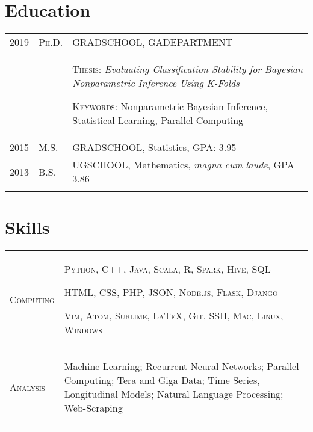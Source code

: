 \documentclass[a4paper,10pt]{article}
\begin{document}
\section{Education}
\begin{supertabular}{p{2cm} p{1.0cm} p{13.9cm}}
	\textsc{2019}		&		\textsc{Ph.D.} & \textsc{GRADSCHOOL}, \small GADEPARTMENT \\
					&&		 \begin{enumerate*}[label =$\diamond$, itemjoin={\newline}] 
							 \item \footnotesize \textsc{Thesis:} \emph{Evaluating Classification Stability for Bayesian Nonparametric Inference Using K-Folds} 
							 \item \footnotesize  \textsc{Keywords:} Nonparametric Bayesian Inference, Statistical Learning, Parallel Computing
							 \end{enumerate*}  \\
	\textsc{2015} 	& 	\textsc{M.S.} & \textsc{GRADSCHOOL}, \small Statistics, GPA: 3.95  \\
	\textsc{2013} 	& 	\textsc{B.S.} & \textsc{UGSCHOOL}, \small Mathematics, \emph{magna cum laude}, GPA 3.86 \\
	 \\
\end{supertabular}


\section{Skills}
\begin{supertabular}{p{3.4cm} p{13.9cm}}

	\textsc{Computing}			& \begin{enumerate*}[label =$\diamond$, itemjoin={\newline}]
																\item \small \textsc{Python, C++, Java, Scala, R, Spark, Hive, SQL}
																\item \small \textsc{HTML, CSS, PHP, JSON, Node.js, Flask, Django}
																\item \small \textsc{Vim, Atom, Sublime, {\fb \LaTeX}, Git, SSH, Mac, Linux, Windows }
																\end{enumerate*} \vspace{2mm} \\


	\textsc{Analysis}				& \begin{enumerate*}[label =$\diamond$, itemjoin={\newline}]
                                \item \small Machine Learning; Recurrent Neural Networks; Parallel Computing; Tera and Giga Data; Time Series, Longitudinal Models; Natural Language Processing; Web-Scraping \end{enumerate*}  \vspace{1mm} \\



\end{supertabular}
\end{document}
